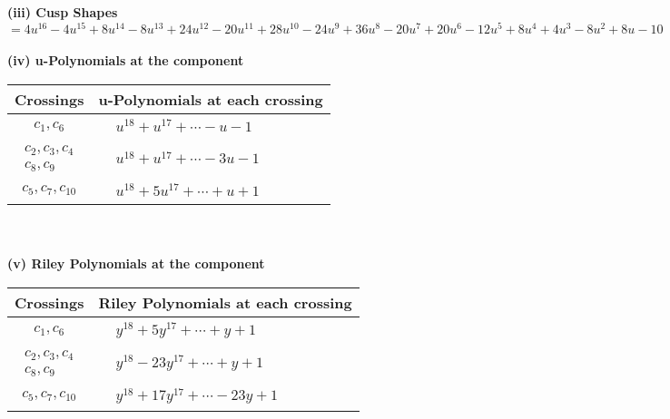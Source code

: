 \documentclass[1p]{elsarticle_modified}
\theoremstyle{definition}
\begin{document}
\flushleft \textbf{(iii) Cusp Shapes $= 4 u^{16}-4 u^{15}+8 u^{14}-8 u^{13}+24 u^{12}-20 u^{11}+28 u^{10}-24 u^9+36 u^8-20 u^7+20 u^6-12 u^5+8 u^4+4 u^3-8 u^2+8 u-10$}\\~\\
\newpage\renewcommand{\arraystretch}{1}
\flushleft \textbf{(iv) u-Polynomials at the component}\newline \\
\begin{tabular}{m{50pt}|m{274pt}}
Crossings & \hspace{64pt}u-Polynomials at each crossing \\
\hline $$\begin{aligned}c_{1},c_{6}\end{aligned}$$&$\begin{aligned}
&u^{18}+u^{17}+\cdots- u-1
\end{aligned}$\\
\hline $$\begin{aligned}c_{2},c_{3},c_{4}\\c_{8},c_{9}\end{aligned}$$&$\begin{aligned}
&u^{18}+u^{17}+\cdots-3 u-1
\end{aligned}$\\
\hline $$\begin{aligned}c_{5},c_{7},c_{10}\end{aligned}$$&$\begin{aligned}
&u^{18}+5 u^{17}+\cdots+u+1
\end{aligned}$\\
\hline
\end{tabular}\\~\\
\newpage\renewcommand{\arraystretch}{1}
\flushleft \textbf{(v) Riley Polynomials at the component}\newline \\
\begin{tabular}{m{50pt}|m{274pt}}
Crossings & \hspace{64pt}Riley Polynomials at each crossing \\
\hline $$\begin{aligned}c_{1},c_{6}\end{aligned}$$&$\begin{aligned}
&y^{18}+5 y^{17}+\cdots+y+1
\end{aligned}$\\
\hline $$\begin{aligned}c_{2},c_{3},c_{4}\\c_{8},c_{9}\end{aligned}$$&$\begin{aligned}
&y^{18}-23 y^{17}+\cdots+y+1
\end{aligned}$\\
\hline $$\begin{aligned}c_{5},c_{7},c_{10}\end{aligned}$$&$\begin{aligned}
&y^{18}+17 y^{17}+\cdots-23 y+1
\end{aligned}$\\
\hline
\end{tabular}\\~\\
\end{document}
